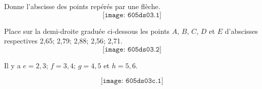 \begin{myenumerate}
  \item Donne l'abscisse des points repérés par une flèche.
\[\texttt{[image: 605ds03.1]}\]
\item Place sur la demi-droite graduée ci-dessous les points $A$, $B$, $C$, $D$ et $E$ d'abscisses respectives 2,65; 2,79; 2,88; 2,56; 2,71.
\[\texttt{[image: 605ds03.2]}\]
\end{myenumerate}
\begin{myenumerate}
  \item Il y a $e=2,3$; $f=3,4$; $g=4,5$ et $h=5,6$.
  \item \[\texttt{[image: 605ds03c.1]}\]
\end{myenumerate}